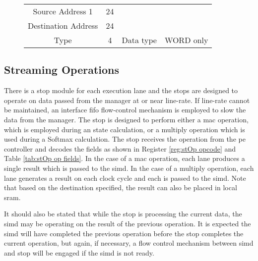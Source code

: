 \begin{figure}[h]
\begin{minipage}{1\textwidth}
\begin{minipage}{1\textwidth}
\begin{minipage}[t]{0.75\textwidth}
\begin{adjustbox}{width=1\textwidth}
\begin{tabular}{ |c|c|c|c|  }
              Source Address 1    & 24 &                                       &                                        \\\cline{1-2}
              Destination Address & 24 &                                       &                                        \\\cline{1-4}
              Type                & 4  & Data type                             & WORD only                              \\\cline{1-4}
              \hline
            \end{tabular}
        \end{adjustbox}
      \end{minipage}
    \end{minipage}
    \label{tab:stOp pointer memory}
  \end{minipage}
\end{figure}


\subsection{Streaming Operations}
\label{sec:stOps}

There is a \ac{stop} module for each execution lane and the \acp{stop} are designed to operate on data passed from the manager at or near line-rate. 
If line-rate cannot be maintained, an interface \ac{fifo} flow-control mechanism is employed to slow the data from the manager.
The \ac{stop} is designed to perform either a \ac{mac} operation, which is employed during \ac{an} state calculation, or a multiply operation which is used during a Softmax \cite{wikipedia_softmax} calculation.
The \ac{stop} receives the operation from the \ac{pe} controller and decodes the fields as shown in Register \ref{reg:stOp opcode} and Table \ref{tab:stOp op fields}.
In the case of a \ac{mac} operation, each lane produces a single result which is passed to the \ac{simd}.
In the case of a multiply operation, each lane generates a result on each clock cycle and each is passed to the \ac{simd}.
Note that based on the destination specified, the result can also be placed in local \ac{sram}.

It should also be stated that while the \ac{stop} is processing the current data, the \ac{simd} may be operating on the result of the previous operation. 
It is expected the \ac{simd} will have completed the previous operation before the \ac{stop} completes the current operation, but again, if necessary, a flow control mechanism between \ac{simd} and \ac{stop} will be engaged if the \ac{simd} is not ready.

